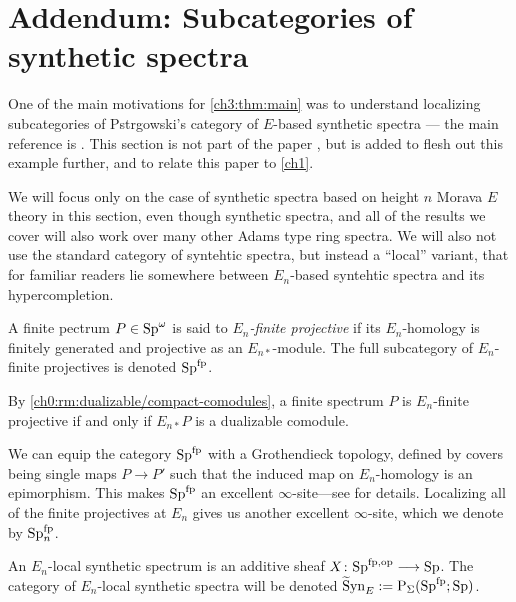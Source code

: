 
\section{Addendum: Subcategories of synthetic spectra}
\label{ch3:addendum}

One of the main motivations for \cref{ch3:thm:main} was to understand localizing subcategories of Pstr\a{}gowski's category of $E$-based synthetic spectra --- the main reference is \cite{pstragowski_2022}. This section is not part of the paper \cite{aambo_2024_localizing}, but is added to flesh out this example further, and to relate this paper to \cref{ch1}. 

We will focus only on the case of synthetic spectra based on height $n$ Morava $E$ theory in this section, even though synthetic spectra, and all of the results we cover will also work over many other Adams type ring spectra. We will also not use the standard category of syntehtic spectra, but instead a ``local'' variant, that for familiar readers lie somewhere between $E_n$-based syntehtic spectra and its hypercompletion. 

\begin{definition}
    A finite pectrum $P\in \mathrm{Sp}^\omega$ is said to \emph{$E_n$-finite projective} if its $E_n$-homology is finitely generated and projective as an $E_{n*}$-module. The full subcategory of $E_n$-finite projectives is denoted $\mathrm{Sp}^{\mathrm{fp}}$. 
\end{definition}

\begin{remark}
    By \cref{ch0:rm:dualizable/compact-comodules}, a finite spectrum $P$ is $E_n$-finite projective if and only if $E_{n*}P$ is a dualizable comodule. 
\end{remark}

We can equip the category $\mathrm{Sp}^{\mathrm{fp}}$ with a Grothendieck topology, defined by covers being single maps $P\to P'$ such that the induced map on $E_n$-homology is an epimorphism. This makes $\mathrm{Sp}^{\mathrm{fp}}$ an excellent $\infty$-site---see \cite[Section 2.3]{pstragowski_2022} for details. Localizing all of the finite projectives at $E_n$ gives us another excellent $\infty$-site, which we denote by $\mathrm{Sp}_{n}^{\mathrm{fp}}$. 

\begin{definition}
    An $E_n$-local synthetic spectrum is an additive sheaf $X\colon \mathrm{Sp}^{\mathrm{fp}, \mathrm{op}}\longrightarrow \mathrm{Sp}$. The category of $E_n$-local synthetic spectra will be denoted $\widetilde{\mathrm{S}}\mathrm{yn}_{E} := \mathrm{P}_\Sigma(\mathrm{Sp}^{\mathrm{fp}};\mathrm{Sp})$. 
\end{definition}


